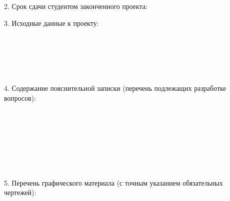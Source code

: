 {  \vspace{1em}

  2. Срок сдачи студентом законченного проекта: \underline{\hspace*{5em}}

  \vspace{1em}

  3. Исходные данные к проекту:\\
  \lineunderscore\\
  \lineunderscore\\
  \lineunderscore\\
  \lineunderscore\\
  \lineunderscore\\

  \vspace{1em}

  4. Содержание пояснительной записки (перечень подлежащих разработке вопросов):
  \lineunderscore\\
  \lineunderscore\\
  \lineunderscore\\
  \lineunderscore\\
  \lineunderscore\\
  \lineunderscore\\
  \lineunderscore\\
  \lineunderscore\\


  \clearpage
  \thispagestyle{empty}

  5. Перечень графического материала (с точным указанием обязательных чертежей):
  \lineunderscore\\
  \lineunderscore\\
  \lineunderscore\\
  \lineunderscore\\
  \lineunderscore\\
  \lineunderscore\\


}
